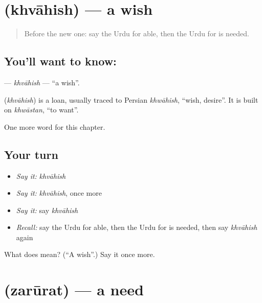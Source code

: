 \section[\texorpdfstring{\ur{خواہش} (khvāhish)}{خواہش (khvāhish)}]{ (khvāhish) — a wish}

\label{lesson:UR-C104-khvahish}



\begin{quote}
Before the new one: say the Urdu for able, then the Urdu for is needed.
\end{quote}

\subsection*{You'll want to know: }
\textbf{} — \emph{khvāhish} — \textquotedblleft{}a wish\textquotedblright{}.

\begin{cousinweb}
\textbf{} (\emph{khvāhish}) is a loan, usually traced to Persian \emph{khwāhish}, \textquotedblleft{}wish, desire\textquotedblright{}. It is built on \emph{khwāstan}, \textquotedblleft{}to want\textquotedblright{}.
\end{cousinweb}

\begin{grammarlens}[title={What you've built}]
One more word for this chapter.
\end{grammarlens}

\subsection*{Your turn}
\begin{itemize}
\raggedright
  \item \emph{Say it:} \emph{khvāhish}
  \item \emph{Say it:} \emph{khvāhish}, once more
  \item \emph{Say it:} say \emph{khvāhish}
  \item \emph{Recall:} say the Urdu for able, then the Urdu for is needed, then say \emph{khvāhish} again
\end{itemize}

\begin{tcolorbox}[breakable,colback=teal!4,colframe=teal!35!black,title={Before you move on}]
What does  mean? (\textquotedblleft{}A wish\textquotedblright{}.) Say it once more.
\end{tcolorbox}
\section[\texorpdfstring{\ur{ضرورت} (zarūrat)}{ضرورت (zarūrat)}]{ (zarūrat) — a need}

